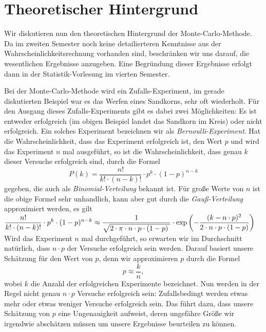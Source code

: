 \begin{center}
\colorbox{orange}{}
\end{center}

\section[Theory]{Theoretischer Hintergrund}
Wir diskutieren nun den theoretischen Hintergrund der Monte-Carlo-Methode.  Da im zweiten Semester noch
keine detailierteren Kenntnisse aus der Wahrscheinlichkeits\-rechnung vorhanden sind, beschr\"anken wir
uns darauf, die wesentlichen Ergebnisse anzugeben.  Eine Begr\"undung dieser Ergebnisse erfolgt dann
in der Statistik-Vorlesung im vierten Semester. 

Bei der Monte-Carlo-Methode wird ein Zufalls-Experiment, im gerade diskutierten Beispiel war es das Werfen
eines Sandkorns, sehr oft wiederholt.  F\"ur den Ausgang dieses Zufalls-Experiments gibt es dabei zwei
M\"oglichkeiten:  Es ist ent\-weder erfolgreich (im obigen Beispiel landet das Sandkorn im Kreis) oder nicht
erfolgreich.  Ein solches Experiment bezeichnen wir als \emph{Bernoulli-Experiment}.
 Hat die Wahrscheinlichkeit, dass das Experiment erfolgreich ist, den Wert $p$ und wird das
Experiment $n$ mal ausgef\"uhrt, so ist die Wahrscheinlichkeit, dass genau $k$ dieser Versuche erfolgreich sind,
durch die Formel
\[ P(k) = \frac{n!}{k! \cdot (n-k)!} \cdot p^k \cdot (1-p)^{n-k} \]
gegeben, die auch als \emph{Binomial-Verteilung} bekannt ist.  F\"ur gro\ss{}e Werte von $n$ ist die obige Formel
sehr unhandlich, kann aber gut durch die \emph{Gau\ss{}-Verteilung} approximiert werden, es gilt
\\[0.2cm]
\hspace*{0.8cm}
$\displaystyle\frac{n!}{k! \cdot (n-k)!} \cdot p^k \cdot (1-p)^{n-k} \approx  
   \frac{1}{\sqrt{2\cdot \pi \cdot n \cdot p \cdot (1-p)\;}} \cdot 
   \exp\left(-\frac{(k - n \cdot p)^2}{2 \cdot n \cdot p \cdot (1 - p)}\right)
$
\\[0.2cm]
Wird das Experiment $n$ mal durchgef\"uhrt, so erwarten wir im Durchschnitt nat\"urlich, dass $n \cdot p$ der
Versuche erfolgreich sein werden.  Darauf basiert unsere Sch\"atzung f\"ur den Wert von $p$, denn wir approximieren
$p$ durch die Formel
\[ p \approx \frac{k}{n}, \]
wobei $k$ die Anzahl der erfolgreichen Experimente bezeichnet.  Nun werden in der Regel nicht genau $n \cdot p$
Versuche erfolgreich sein: Zufallsbedingt werden etwas mehr oder etwas weniger Versuche
erfolgreich sein.  Das f\"uhrt dazu, dass unsere Sch\"atzung von $p$ eine Ungenauigkeit aufweist, deren ungef\"ahre
Gr\"o\ss{}e wir irgendwie absch\"atzen m\"ussen um unsere Ergebnisse beurteilen zu k\"onnen.

